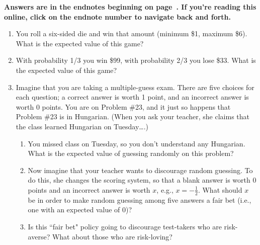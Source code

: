 \noindent \textbf{Answers are in the endnotes beginning on page~\pageref{1uncertaintya}. If you're reading this online, click on the endnote number to navigate back and forth.}


\begin{enumerate}



\item You roll a six-sided die and win that amount (minimum \$1, maximum \$6). What is the expected value of this game?



\item With probability 1/3 you win \$99, with probability 2/3 you lose \$33. What is the expected value of this game?




\item Imagine that you are taking a multiple-guess exam. There are five choices for each question; a correct answer is worth 1 point, and an incorrect answer is worth 0 points. You are on Problem \#23, and it just so happens that Problem \#23 is in Hungarian. (When you ask your teacher, she claims that the class learned Hungarian on Tuesday\ldots.)
    \begin{enumerate}
    \item You missed class on Tuesday, so you don't understand any  Hungarian. What is the expected value of guessing randomly on this problem?


    \item Now imagine that your teacher wants to discourage random guessing. To do this, she changes the scoring system, so that a blank answer is worth 0 points and an incorrect answer is worth $x$, e.g., $x=-\frac{1}{2}$. What should $x$ be in order to make random guessing among five answers a fair bet (i.e., one with an expected value of 0)?


   \item Is this ``fair bet" policy going to discourage test-takers who are risk-averse? %
What about those who are risk-loving?%



\end{enumerate}
\end{enumerate}
